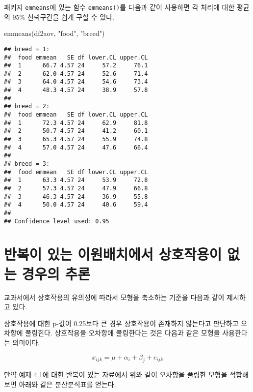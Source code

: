 \documentclass[
]{book}
\newenvironment{Shaded}{\begin{snugshade}}{\end{snugshade}}
\newcommand{\FunctionTok}[1]{\textcolor[rgb]{0.00,0.00,0.00}{#1}}
\newcommand{\NormalTok}[1]{#1}
\newcommand{\StringTok}[1]{\textcolor[rgb]{0.31,0.60,0.02}{#1}}
\begin{document}
패키지 \texttt{emmeans}에 있는 함수 \texttt{emmeans()}를 다음과 같이 사용하면 각 처리에 대한 평균의 95\% 신뢰구간을 쉽게 구할 수 있다.

\begin{Shaded}
\begin{Highlighting}[]
\FunctionTok{emmeans}\NormalTok{(df2aov, }\StringTok{"food"}\NormalTok{, }\StringTok{"breed"}\NormalTok{)}
\end{Highlighting}
\end{Shaded}

\begin{verbatim}
## breed = 1:
##  food emmean   SE df lower.CL upper.CL
##  1      66.7 4.57 24     57.2     76.1
##  2      62.0 4.57 24     52.6     71.4
##  3      64.0 4.57 24     54.6     73.4
##  4      48.3 4.57 24     38.9     57.8
## 
## breed = 2:
##  food emmean   SE df lower.CL upper.CL
##  1      72.3 4.57 24     62.9     81.8
##  2      50.7 4.57 24     41.2     60.1
##  3      65.3 4.57 24     55.9     74.8
##  4      57.0 4.57 24     47.6     66.4
## 
## breed = 3:
##  food emmean   SE df lower.CL upper.CL
##  1      63.3 4.57 24     53.9     72.8
##  2      57.3 4.57 24     47.9     66.8
##  3      46.3 4.57 24     36.9     55.8
##  4      50.0 4.57 24     40.6     59.4
## 
## Confidence level used: 0.95
\end{verbatim}

\hypertarget{uxbc18uxbcf5uxc774-uxc788uxb294-uxc774uxc6d0uxbc30uxce58uxc5d0uxc11c-uxc0c1uxd638uxc791uxc6a9uxc774-uxc5c6uxb294-uxacbduxc6b0uxc758-uxcd94uxb860}{%
\section{반복이 있는 이원배치에서 상호작용이 없는 경우의 추론}\label{uxbc18uxbcf5uxc774-uxc788uxb294-uxc774uxc6d0uxbc30uxce58uxc5d0uxc11c-uxc0c1uxd638uxc791uxc6a9uxc774-uxc5c6uxb294-uxacbduxc6b0uxc758-uxcd94uxb860}}

교과서에서 상호작용의 유의성에 따라서 모형을 축소하는 기준을 다음과 같이 제시하고 있다.

상호작용에 대한 p-값이 0.25보다 큰 경우 상호작용이 존재하지 않는다고 판단하고 오차항에 풀링힌다. 상호작용을 오차항에 풀링한다는 것은 다음과 같은 모형을 사용한다는 의미이다.

\begin{equation}
 x_{ijk} = \mu + \alpha_i + \beta_j + e_{ijk} 
\label{eq:nointer}
\end{equation}

만약 예제 4.1에 대한 반복이 있는 자료에서 위와 같이 오차항을 풀링한 모형을 적합해 보면 아래와 같은 분산분석표를 얻는다.
\end{document}

